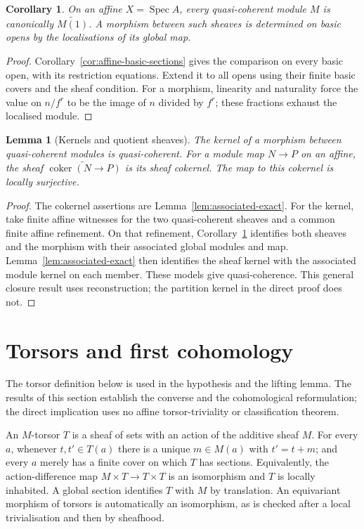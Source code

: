 \documentclass[11pt]{amsart}
\newtheorem{lemma}[theorem]{Lemma}
\newtheorem{corollary}[theorem]{Corollary}
\theoremstyle{definition}\newtheorem{definition}[theorem]{Definition}
\theoremstyle{remark}\newtheorem{remark}[theorem]{Remark}
\newcommand{\Spec}{\operatorname{Spec}}
\begin{document}
\begin{corollary}\label{cor:affine-reconstruction}
On an affine $X=\Spec A$, every quasi-coherent module $M$ is
canonically $\widetilde{M(1)}$. A morphism between such sheaves is
determined on basic opens by the localisations of its global map.
\end{corollary}
\begin{proof}
Corollary~\ref{cor:affine-basic-sections} gives the comparison on
every basic open, with its restriction equations. Extend it to all opens using
their finite basic covers and the sheaf condition. For a morphism,
linearity and naturality force the value on $n/f^r$ to be the image
of $n$ divided by $f^r$; these fractions exhaust the localised module.
\end{proof}

\begin{lemma}[Kernels and quotient sheaves]\label{lem:kernels}
The kernel of a morphism between quasi-coherent modules is
quasi-coherent. For a module map $N\to P$ on an affine, the sheaf
$\widetilde{\operatorname{coker}(N\to P)}$ is its sheaf cokernel.
The map to this cokernel is locally surjective.
\end{lemma}
\begin{proof}
The cokernel assertions are Lemma~\ref{lem:associated-exact}.
For the kernel, take finite affine witnesses for the two quasi-coherent
sheaves and a common finite affine refinement. On that refinement,
Corollary~\ref{cor:affine-reconstruction} identifies both sheaves and
the morphism with their associated global modules and map.
Lemma~\ref{lem:associated-exact} then identifies the sheaf kernel
with the associated module kernel on each member. These models give
quasi-coherence. This general closure result uses reconstruction;
the partition kernel in the direct proof does not.
\end{proof}

\section{Torsors and first cohomology}\label{sec:torsors}
The torsor definition below is used in the hypothesis and the lifting
lemma. The results of this section establish the converse and the
cohomological reformulation; the direct implication uses no affine
torsor-triviality or classification theorem.

An $M$-torsor $T$ is a sheaf of sets with an action of the additive
sheaf $M$. For every $a$, whenever $t,t'\in T(a)$ there is a unique
$m\in M(a)$ with $t'=t+m$; and every $a$ merely has a finite
cover on which $T$ has sections. Equivalently, the action-difference
map $M\times T\to T\times T$ is an isomorphism and $T$ is locally
inhabited. A global section identifies $T$ with $M$ by translation.
An equivariant morphism of torsors is automatically an isomorphism,
as is checked after a local trivialisation and then by sheafhood.
\end{document}
